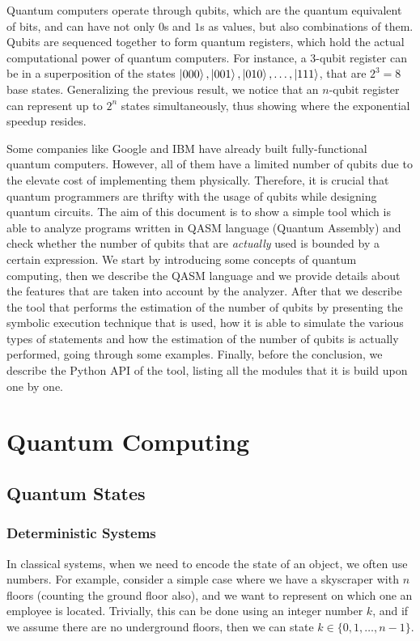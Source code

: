 \documentclass[12pt,a4paper]{report}
\theoremstyle{definition}
\theoremstyle{definition}
\theoremstyle{definition}
\begin{document}
Quantum computers operate through qubits, which are the quantum equivalent of bits, and can have not only $0$s and $1$s as values, but also combinations of them. Qubits are sequenced together to form quantum registers, which hold the actual computational power of quantum computers. For instance, a 3-qubit register can be in a superposition of the states $\ket{000}, \ket{001}, \ket{010}, \ldots, \ket{111}$, that are $2^3=8$ base states. Generalizing the previous result, we notice that an $n$-qubit register can represent up to $2^n$ states simultaneously, thus showing where the exponential speedup resides.

Some companies like Google and IBM have already built fully-functional quantum computers. However, all of them have a limited number of qubits due to the elevate cost of implementing them physically. Therefore, it is crucial that quantum programmers are thrifty with the usage of qubits while designing quantum circuits. The aim of this document is to show a simple tool which is able to analyze programs written in QASM language (Quantum Assembly) and check whether the number of qubits that are \textit{actually} used is bounded by a certain expression.
We start by introducing some concepts of quantum computing, then we describe the QASM language and we provide details about the features that are taken into account by the analyzer. After that we describe the tool that performs the estimation of the number of qubits by presenting the symbolic execution technique that is used, how it is able to simulate the various types of statements and how the estimation of the number of qubits is actually performed, going through some examples. Finally, before the conclusion, we describe the Python API of the tool, listing all the modules that it is build upon one by one.



\chapter{Quantum Computing}


\section{Quantum States}
\subsection{Deterministic Systems}
In classical systems, when we need to encode the state of an object, we often use numbers. For example, consider a simple case where we have a skyscraper with $n$ floors (counting the ground floor also), and we want to represent on which one an employee is located. Trivially, this can be done using an integer number $k$, and if we assume there are no underground floors, then we can state $k \in \{0, 1, \ldots, n-1\}$.
\end{document}

